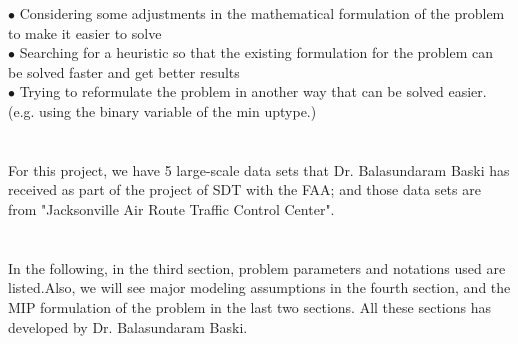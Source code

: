 \documentclass[11pt]{article}
\begin{document}
\indent  $\bullet$ Considering some adjustments in the mathematical formulation of the problem to make it easier to solve\\

 \indent $\bullet$ Searching for a heuristic so that the existing  formulation for the problem can be solved faster and get better results\\
 
 \indent $\bullet$ Trying to reformulate the problem in another way that can be solved easier.(e.g. using the binary variable of the min up\down type.) \\
 \\
 \\

 For this project, we have 5 large-scale data sets that Dr. Balasundaram Baski has received as part of the project of SDT with the FAA; and those data sets are from "Jacksonville Air Route Traffic Control Center". \\

\\

\\
In the following, in the third section, problem parameters and notations used are listed.Also, we will see major modeling assumptions in the fourth section, and the MIP formulation of the problem in the last two sections. All these sections has developed by Dr. Balasundaram Baski.


\newpage
\end{document}
